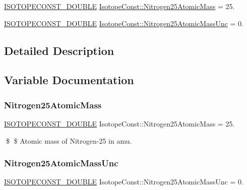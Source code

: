 \begin{DoxyCompactItemize}
\item 
\mbox{\hyperlink{group___isotope_const-_macros_ga8f45a7272ce02c0b4c65c44636ed719a}{I\+S\+O\+T\+O\+P\+E\+C\+O\+N\+S\+T\+\_\+\+D\+O\+U\+B\+LE}} \mbox{\hyperlink{group___isotope_const-_nitrogen-_n25_ga932406d993a1d4256b7d8cf470de79a9}{Isotope\+Const\+::\+Nitrogen25\+Atomic\+Mass}} = 25.
\item 
\mbox{\hyperlink{group___isotope_const-_macros_ga8f45a7272ce02c0b4c65c44636ed719a}{I\+S\+O\+T\+O\+P\+E\+C\+O\+N\+S\+T\+\_\+\+D\+O\+U\+B\+LE}} \mbox{\hyperlink{group___isotope_const-_nitrogen-_n25_gad4992e66137e073aa89602a0bfb6aba1}{Isotope\+Const\+::\+Nitrogen25\+Atomic\+Mass\+Unc}} = 0.
\end{DoxyCompactItemize}


\subsection{Detailed Description}


\subsection{Variable Documentation}
\mbox{\label{group___isotope_const-_nitrogen-_n25_ga932406d993a1d4256b7d8cf470de79a9}} 
\subsubsection{\texorpdfstring{Nitrogen25\+Atomic\+Mass}{Nitrogen25AtomicMass}}
{\footnotesize\ttfamily \mbox{\hyperlink{group___isotope_const-_macros_ga8f45a7272ce02c0b4c65c44636ed719a}{I\+S\+O\+T\+O\+P\+E\+C\+O\+N\+S\+T\+\_\+\+D\+O\+U\+B\+LE}} Isotope\+Const\+::\+Nitrogen25\+Atomic\+Mass = 25.}

\$ \$ Atomic mass of Nitrogen-\/25 in amu. \mbox{\label{group___isotope_const-_nitrogen-_n25_gad4992e66137e073aa89602a0bfb6aba1}} 
\subsubsection{\texorpdfstring{Nitrogen25\+Atomic\+Mass\+Unc}{Nitrogen25AtomicMassUnc}}
{\footnotesize\ttfamily \mbox{\hyperlink{group___isotope_const-_macros_ga8f45a7272ce02c0b4c65c44636ed719a}{I\+S\+O\+T\+O\+P\+E\+C\+O\+N\+S\+T\+\_\+\+D\+O\+U\+B\+LE}} Isotope\+Const\+::\+Nitrogen25\+Atomic\+Mass\+Unc = 0.}

